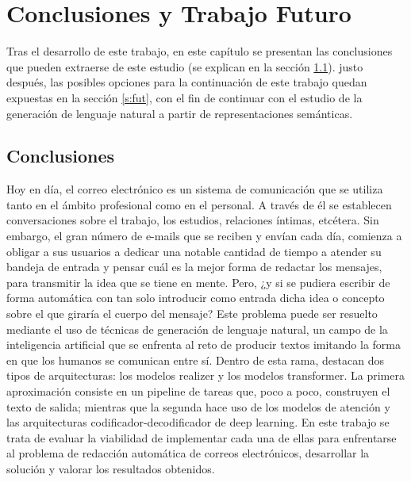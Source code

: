 \chapter{Conclusiones y Trabajo Futuro}
\label{cap:conclusiones}


Tras el desarrollo de este trabajo, en este capítulo se presentan las conclusiones que pueden extraerse de este estudio (se explican en la sección \ref{s:concl}). justo después, las posibles opciones para la continuación de este trabajo quedan expuestas en la sección \ref{s:fut}, con el fin de continuar con el estudio de la generación de lenguaje natural a partir de representaciones semánticas.

\section{Conclusiones}\label{s:concl}

Hoy en día, el correo electrónico es un sistema de comunicación que se utiliza tanto en el ámbito profesional como en el personal. A través de él se establecen conversaciones sobre el trabajo, los estudios, relaciones íntimas, etcétera. Sin embargo, el gran número de e-mails que se reciben y envían cada día, comienza a obligar a sus usuarios a dedicar una notable cantidad de tiempo a atender su bandeja de entrada y pensar cuál es la mejor forma de redactar los mensajes, para transmitir la idea que se tiene en mente. Pero, ¿y si se pudiera escribir de forma automática con tan solo introducir como entrada dicha idea o concepto sobre el que giraría el cuerpo del mensaje? Este problema puede ser resuelto mediante el uso de técnicas de generación de lenguaje natural, un campo de la inteligencia artificial que se enfrenta al reto de producir textos imitando la forma en que los humanos se comunican entre sí. Dentro de esta rama, destacan dos tipos de arquitecturas: los modelos realizer y los modelos transformer. La primera aproximación consiste en un pipeline de tareas que, poco a poco, construyen el texto de salida; mientras que la segunda hace uso de los modelos de atención y las arquitecturas codificador-decodificador de deep learning. En este trabajo se trata de evaluar la viabilidad de implementar cada una de ellas para enfrentarse al problema de redacción automática de correos electrónicos, desarrollar la solución y valorar los resultados obtenidos.

